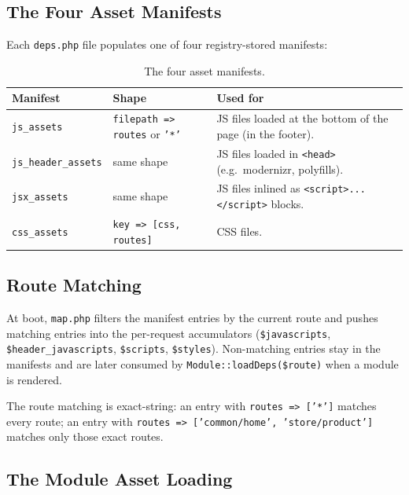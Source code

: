 \documentclass[11pt,a4paper]{article}
\begin{document}
\subsection{The Four Asset Manifests}

Each \texttt{deps.php} file populates one of four registry-stored
manifests:

\begin{table}[htbp]
\centering
\caption{The four asset manifests.}\label{tab:asset-manifests}
\footnotesize\sloppy
\begin{tabularx}{\columnwidth}{>{\raggedright\arraybackslash}p{3.0cm}>{\raggedright\arraybackslash}p{4.5cm}X}
\toprule
\textbf{Manifest} & \textbf{Shape} & \textbf{Used for} \\
\midrule
\texttt{js\_assets}         & \texttt{filepath => routes} or \texttt{'*'} & JS files loaded at the bottom of the page (in the footer). \\
\texttt{js\_header\_assets} & same shape & JS files loaded in \texttt{<head>} (e.g.\ modernizr, polyfills). \\
\texttt{jsx\_assets}        & same shape & JS files inlined as \texttt{<script>...</script>} blocks. \\
\texttt{css\_assets}        & \texttt{key => [css, routes]} & CSS files. \\
\bottomrule
\end{tabularx}
\end{table}

\subsection{Route Matching}

At boot, \texttt{map.php} filters the manifest entries by the
current route and pushes matching entries into the per-request
accumulators (\texttt{\$javascripts},
\texttt{\$header\_javascripts}, \texttt{\$scripts},
\texttt{\$styles}). Non-matching entries stay in the manifests and
are later consumed by \texttt{Module::loadDeps(\$route)} when a
module is rendered.

The route matching is exact-string: an entry with
\texttt{routes => ['*']} matches every route; an entry with
\texttt{routes => ['common/home', 'store/product']} matches only
those exact routes.

\subsection{The Module Asset Loading}
\end{document}

